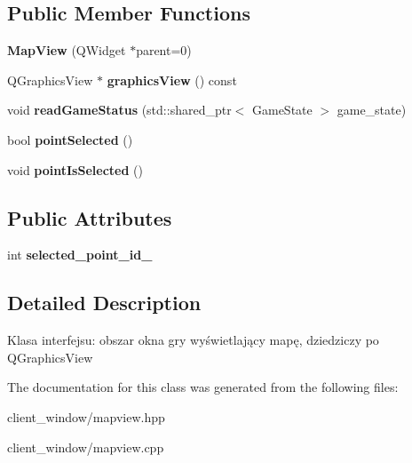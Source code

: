 \subsection*{Public Member Functions}
\begin{DoxyCompactItemize}
\item 
{\bfseries Map\+View} (Q\+Widget $\ast$parent=0)\hypertarget{classMapView_a4dbedd735235252920e1ce4265768d31}{}\label{classMapView_a4dbedd735235252920e1ce4265768d31}

\item 
Q\+Graphics\+View $\ast$ {\bfseries graphics\+View} () const \hypertarget{classMapView_aad89785cc6217fb112498e893f18d34e}{}\label{classMapView_aad89785cc6217fb112498e893f18d34e}

\item 
void {\bfseries read\+Game\+Status} (std\+::shared\+\_\+ptr$<$ Game\+State $>$ game\+\_\+state)\hypertarget{classMapView_a71f8f8e460fbb2593bf931402f64b315}{}\label{classMapView_a71f8f8e460fbb2593bf931402f64b315}

\item 
bool {\bfseries point\+Selected} ()\hypertarget{classMapView_a08a0bc12af9ed3be5634f310a547436c}{}\label{classMapView_a08a0bc12af9ed3be5634f310a547436c}

\item 
void {\bfseries point\+Is\+Selected} ()\hypertarget{classMapView_a31c953eb544594fca9beb7c713d1fff6}{}\label{classMapView_a31c953eb544594fca9beb7c713d1fff6}

\end{DoxyCompactItemize}
\subsection*{Public Attributes}
\begin{DoxyCompactItemize}
\item 
int {\bfseries selected\+\_\+point\+\_\+id\+\_\+}\hypertarget{classMapView_ab981b6988372e64566774db5cc70df04}{}\label{classMapView_ab981b6988372e64566774db5cc70df04}

\end{DoxyCompactItemize}


\subsection{Detailed Description}
Klasa interfejsu\+: obszar okna gry wyświetlający mapę, dziedziczy po Q\+Graphics\+View 

The documentation for this class was generated from the following files\+:\begin{DoxyCompactItemize}
\item 
client\+\_\+window/mapview.\+hpp\item 
client\+\_\+window/mapview.\+cpp\end{DoxyCompactItemize}
